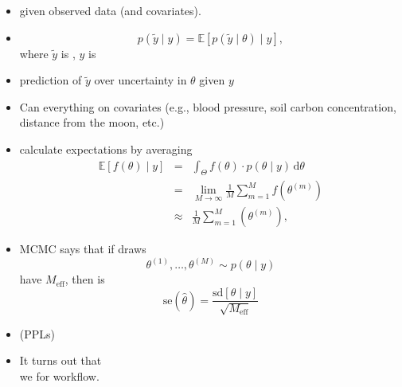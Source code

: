 \documentclass[10pt]{report}
\newcommand{\draw}[2]{#1^{(#2)}}
\newcommand{\displayfrac}[2]{{\displaystyle \frac{\displaystyle #1}{\displaystyle #2}}}
\begin{document}
\begin{itemize}
\item {} given observed data (and covariates).
\item {}
$$p(\tilde{y} \mid y) =
  \mathbb{E}[p(\tilde{y} \mid \theta) \mid y],
$$
where $\tilde{y}$ is , $y$ is 
\item {} prediction of $\tilde{y}$ over uncertainty in $\theta$
  given $y$
\item Can  everything on covariates (e.g., blood pressure,
  soil carbon concentration, distance from the moon, etc.)
\end{itemize}

\begin{itemize}
  \item calculate  expectations by averaging
\begin{eqnarray*}
  \mathbb{E}[f(\theta) \mid y]
  & = & \textstyle \int_{\Theta} f(\theta) \cdot p(\theta \mid y) \,
        \textrm{d}\theta
        \\[4pt]
  & = & \textstyle \lim_{M \rightarrow \infty} \frac{1}{M} \sum_{m = 1}^M
        f(\draw{\theta}{m})
        \\[4pt]
  & \approx & \textstyle \frac{1}{M} \sum_{m = 1}^M (\draw{\theta}{m}),
\end{eqnarray*}
\item MCMC  says that if draws
\[
  \draw{\theta}{1}, \ldots, \draw{\theta}{M} \sim p(\theta \mid y)
\]
have  $M_{\textrm{eff}}$, then
 is
\[
\textrm{se}(\hat{\theta})
  = \displayfrac{\textrm{sd}[\theta \mid y]}
                {\sqrt{M_{\textrm{eff}}}} 
\]
\end{itemize}

\begin{itemize}
\item {} (PPLs)
  \vfill
\item It turns out that
  \\
  we  for workflow.
\end{itemize}
\end{document}
